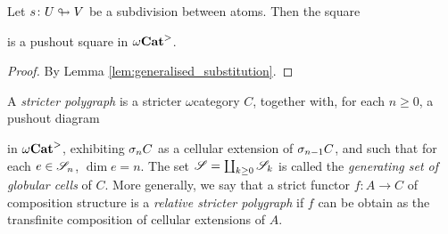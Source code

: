 \begin{cor} \label{cor:pushout_principal_cell}
    Let \( s \colon U \looparrowright V \) be a subdivision between atoms.
    Then the square
    \begin{center}
    \end{center}
    is a pushout square in \( {\omega\mathbf{Cat}}^> \).
\end{cor}
\begin{proof}
    By Lemma \ref{lem:generalised_substitution}.
\end{proof}

\begin{dfn}  \label{dfn:stricter_polygraph}
    A \emph{stricter polygraph} is a stricter \( \omega \)\nbd category \( C \), together with, for each \( n \geq 0 \), a pushout diagram
    \begin{center}
    \end{center}
    in \( {\omega\mathbf{Cat}}^> \), exhibiting \( \sigma_{n}C \) as a cellular extension of \( \sigma_{n - 1}C \), and such that for each \( e \in \mathscr{S}_n \), \( \dim e = n \).
    The set \( \mathscr{S} = \coprod_{k \geq 0} \mathscr{S}_k \) is called the \emph{generating set of globular cells} of \( C \).
    More generally, we say that a strict functor \( f \colon A \to C \) of composition structure is a \emph{relative stricter polygraph} if \( f \) can be obtain as the transfinite composition of cellular extensions of \( A \).
\end{dfn}

